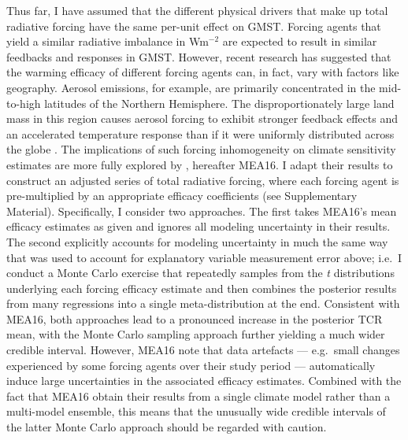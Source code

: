\documentclass[smallextended]{svjour3}       %
\begin{document}
Thus far, I have assumed that the different physical drivers that make
up total radiative forcing have the same per-unit effect on GMST.
Forcing agents that yield a similar radiative imbalance in Wm\(^{-2}\)
are expected to result in similar feedbacks and responses in GMST.
However, recent research has suggested that the warming efficacy of
different forcing agents can, in fact, vary with factors like geography.
Aerosol emissions, for example, are primarily concentrated in the
mid-to-high latitudes of the Northern Hemisphere. The disproportionately
large land mass in this region causes aerosol forcing to exhibit
stronger feedback effects and an accelerated temperature response than
if it were uniformly distributed across the globe
\cite{shindell2014tcr}. The implications of such forcing inhomogeneity
on climate sensitivity estimates are more fully explored by
\cite{marvel2016implications}, hereafter MEA16. I adapt their results to
construct an adjusted series of total radiative forcing, where each
forcing agent is pre-multiplied by an appropriate efficacy coefficients
(see Supplementary Material). Specifically, I consider two approaches.
The first takes MEA16's mean efficacy estimates as given and ignores all
modeling uncertainty in their results. The second explicitly accounts
for modeling uncertainty in much the same way that was used to account
for explanatory variable measurement error above; i.e.~I conduct a Monte
Carlo exercise that repeatedly samples from the \emph{t} distributions
underlying each forcing efficacy estimate and then combines the
posterior results from many regressions into a single meta-distribution
at the end. Consistent with MEA16, both approaches lead to a pronounced
increase in the posterior TCR mean, with the Monte Carlo sampling
approach further yielding a much wider credible interval. However, MEA16
note that data artefacts --- e.g.~small changes experienced by some
forcing agents over their study period --- automatically induce large
uncertainties in the associated efficacy estimates. Combined with the
fact that MEA16 obtain their results from a single climate model rather
than a multi-model ensemble, this means that the unusually wide credible
intervals of the latter Monte Carlo approach should be regarded with
caution.
\end{document}
